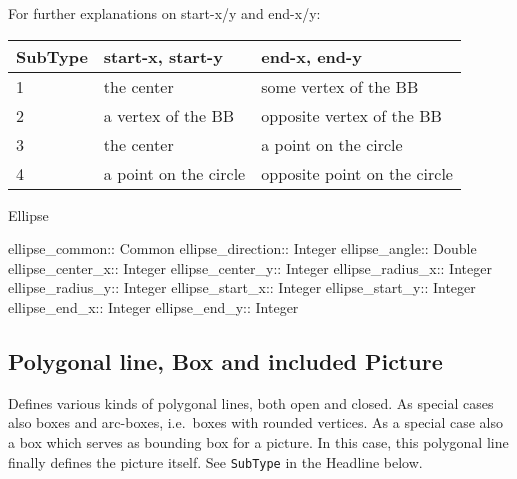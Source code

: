 \documentclass[10pt, a4paper]{article}
\begin{document}
\noindent
For further explanations on start-x/y and end-x/y: \\
%
\begin{tabular}{lll}
\toprule
SubType  & start-x, start-y  & end-x, end-y \\
\midrule
\midrule
1 & the center            & some vertex of the BB \\
2 & a vertex of the BB    & opposite vertex of the BB \\
3 & the center            & a point on the circle \\
4 & a point on the circle & opposite point on the circle \\
\bottomrule
\end{tabular}

Ellipse	 

ellipse\_common:: Common
ellipse\_direction:: Integer
ellipse\_angle:: Double
ellipse\_center\_x:: Integer
ellipse\_center\_y:: Integer
ellipse\_radius\_x:: Integer
ellipse\_radius\_y:: Integer
ellipse\_start\_x:: Integer
ellipse\_start\_y:: Integer
ellipse\_end\_x:: Integer
ellipse\_end\_y:: Integer

\subsection{Polygonal line, Box and included Picture}\label{subsec:polyline}

Defines various kinds of polygonal lines, both open and closed. 
As special cases also boxes and arc-boxes, i.e.~boxes with rounded vertices. 
As a special case also a box which serves as bounding box for a picture. 
In this case, this polygonal line finally defines the picture itself. 
See \texttt{SubType} in the Headline below. 
\end{document}
